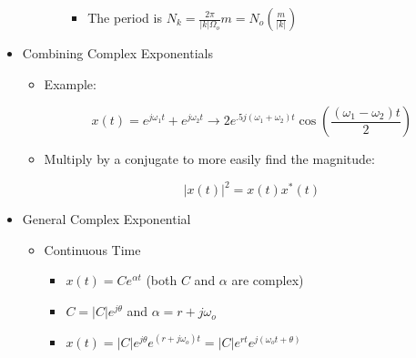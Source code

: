 \begin{itemize}
\begin{itemize}
\begin{itemize}
\begin{itemize}
              \item The period is $N_k=\frac{2\pi}{|k|\Omega_o}m=N_o\left(\frac{m}{|k|}\right)$

            \end{itemize}

        \end{itemize}

    \end{itemize}

  \item Combining Complex Exponentials

    \begin{itemize}

      \item Example:

        $$x(t)=e^{j\omega_1t}+e^{j\omega_2t}\to 2e^{.5j(\omega_1+\omega_2)t}\cos\left( \frac{(\omega_1-\omega_2)t}{2} \right)$$

      \item Multiply by a conjugate to more easily find the magnitude:

        $$|x(t)|^2=x(t)x^*(t)$$

    \end{itemize}

  \item General Complex Exponential

    \begin{itemize}

      \item Continuous Time

        \begin{itemize}

          \item $x(t)=Ce^{\alpha t}$ (both $C$ and $\alpha$ are complex)

          \item $C=|C|e^{j\theta}$ and $\alpha=r+j\omega_o$

          \item $x(t)=|C|e^{j\theta}e^{(r+j\omega_o)t}=|C|e^{rt}e^{j(\omega_ot+\theta)}$

        \end{itemize}

    \end{itemize}

\end{itemize}



